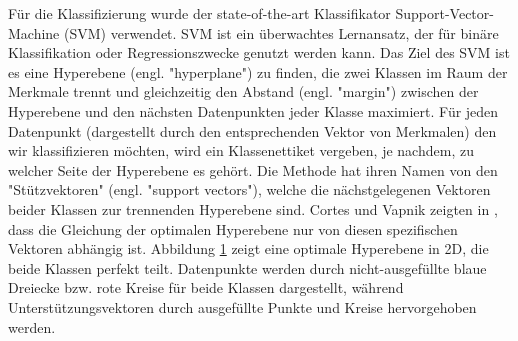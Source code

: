 Für die Klassifizierung wurde der state-of-the-art Klassifikator Support-Vector-Machine (SVM) verwendet.
SVM ist ein überwachtes Lernansatz, der für binäre Klassifikation oder Regressionszwecke genutzt werden kann. 
Das Ziel des SVM ist es eine Hyperebene (engl. "hyperplane") zu finden, die zwei Klassen im Raum der Merkmale trennt und gleichzeitig den Abstand (engl. "margin") zwischen der Hyperebene und den nächsten Datenpunkten jeder Klasse maximiert.
Für jeden Datenpunkt (dargestellt durch den entsprechenden Vektor von Merkmalen) den wir klassifizieren möchten, wird ein Klassenettiket vergeben, je nachdem, zu welcher Seite der Hyperebene es gehört.
Die Methode hat ihren Namen von den "Stützvektoren" (engl. "support vectors"), welche die nächstgelegenen Vektoren beider Klassen zur trennenden Hyperebene sind. 
Cortes und Vapnik zeigten in \cite{svn1995}, dass die Gleichung der optimalen Hyperebene nur von diesen spezifischen Vektoren abhängig ist.
Abbildung \ref{fig:svm} zeigt eine optimale Hyperebene in 2D, die beide Klassen perfekt teilt.
Datenpunkte werden durch nicht-ausgefüllte blaue Dreiecke bzw. rote Kreise für beide Klassen dargestellt, während Unterstützungsvektoren durch ausgefüllte Punkte und Kreise hervorgehoben werden. \\

\begin{figure}[h] 
\label{fig:svm} 
\end{figure} %

